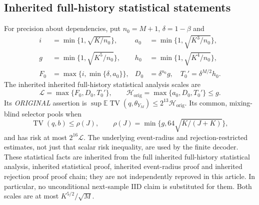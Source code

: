 \documentclass[11pt,letterpaper]{article}
\theoremstyle{definition}\newtheorem{definition}[theorem]{Definition}
\theoremstyle{remark}\newtheorem{remark}[theorem]{Remark}
\newcommand{\TV}{\operatorname{TV}}
\newcommand{\E}{\mathbb{E}}
\begin{document}
\subsection{Inherited full-history statistical statements}
For precision about dependencies, put $n_0=M+1$, $\delta=1-\beta$ and
\begin{align*}
 i&=\min\{1,\sqrt{K/n_0}\},& a_0&=\min\{1,\sqrt{K^3/n_0}\},\\
 g&=\min\{1,\sqrt{K^5/n_0}\},& h_0&=\min\{1,\sqrt{K^4/n_0}\},\\
 F_0&=\max\{i,\min\{\delta,a_0\}\},&
 D_0&=\delta^{n_0}g,\quad T_0'=\delta^{M/2}h_0.
\end{align*}
The inherited inherited full-history statistical analysis scales are
\begin{equation}\label{eq:inherited}
 \mathcal L=\max\{F_0,D_0,T_0'\},\qquad
 \mathcal H_{\mathrm{orig}}=\max\{a_0,D_0,T_0'\}\le g.
\end{equation}
Its \emph{ORIGINAL} assertion is $\sup\E\TV(q,\theta_{Y_M})\le2^{13}\mathcal H_{\mathrm{orig}}$. Its common, mixing-blind selector pools when
\[
 \TV(q,b)\le\rho(J),\qquad \rho(J)=\min\{g,64\sqrt{K/(J+K)}\},
\]
and has risk at most $2^{16}\mathcal L$. The underlying event-radius and rejection-restricted estimates, not just that scalar risk inequality, are used by the finite decoder. These statistical facts are inherited from the full inherited full-history statistical analysis, inherited statistical proof, inherited event-radius proof and inherited rejection proof proof chain; they are not independently reproved in this article. In particular, no unconditional next-sample IID claim is substituted for them. Both scales are at most $K^{5/2}/\sqrt M$.
\end{document}
